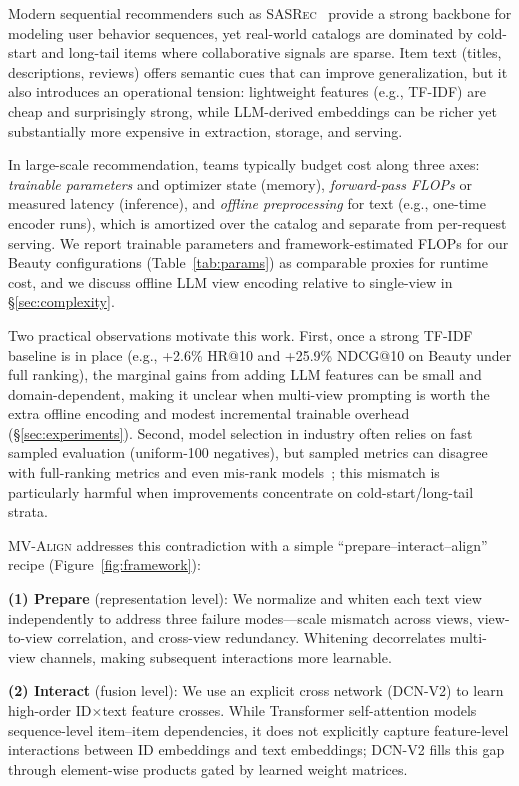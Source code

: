 \documentclass[sigconf,natbib=true,anonymous]{acmart}
\newcommand{\model}{\textsc{MV-Align}\xspace}
\newcommand{\base}{\textsc{SASRec}\xspace}
\newcommand{\tfidf}{\textsc{TF-IDF}\xspace}
\newcommand{\llm}{\textsc{LLM}\xspace}
\begin{document}
Modern sequential recommenders such as \base~\cite{kang2018sasrec}
provide a strong backbone for modeling user behavior sequences,
yet real-world catalogs are dominated by cold-start and long-tail
items where collaborative signals are sparse. Item text (titles,
descriptions, reviews) offers semantic cues that can improve
generalization, but it also introduces an operational tension:
lightweight features (e.g., \tfidf) are cheap and surprisingly
strong, while \llm-derived embeddings can be richer yet
substantially more expensive in extraction, storage, and serving.

In large-scale recommendation, teams typically budget cost along
three axes: \emph{trainable parameters} and optimizer state (memory),
\emph{forward-pass FLOPs} or measured latency (inference), and
\emph{offline preprocessing} for text (e.g., one-time encoder runs),
which is amortized over the catalog and separate from per-request
serving.
We report trainable parameters and framework-estimated FLOPs for our
Beauty configurations (Table~\ref{tab:params}) as comparable proxies
for runtime cost, and we discuss offline \llm view encoding relative
to single-view in \S\ref{sec:complexity}.

Two practical observations motivate this work. First, once a
strong \tfidf baseline is in place (e.g., +2.6\% HR@10 and
+25.9\% NDCG@10 on Beauty under full ranking), the marginal
gains from adding \llm features can be small and domain-dependent,
making it unclear when multi-view prompting is worth the extra
offline encoding and modest incremental trainable overhead
(\S\ref{sec:experiments}). Second, model selection in industry often relies on fast
sampled evaluation (uniform-100 negatives), but
sampled metrics can disagree with full-ranking metrics and even
mis-rank models~\cite{krichene2020sampledmetrics}; this mismatch
is particularly harmful when improvements concentrate on
cold-start/long-tail strata.

\model addresses this contradiction with a simple
``prepare--interact--align'' recipe (Figure~\ref{fig:framework}):

\textbf{(1) Prepare} (representation level): We normalize
and whiten each text view independently to address three failure
modes---scale mismatch across views, view-to-view correlation,
and cross-view redundancy. Whitening decorrelates multi-view
channels, making subsequent interactions more learnable.

\textbf{(2) Interact} (fusion level): We use an explicit cross
network (DCN-V2) to learn high-order ID$\times$text feature
crosses. While Transformer self-attention models sequence-level
item--item dependencies, it does not explicitly capture
feature-level interactions between ID embeddings and text
embeddings; DCN-V2 fills this gap through element-wise products
gated by learned weight matrices.
\end{document}

